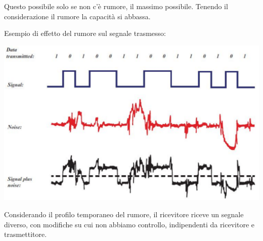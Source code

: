 Questo possibile solo se non c'è rumore, il massimo possibile. Tenendo il considerazione il rumore la capacità si abbassa.

Esempio di effetto del rumore sul segnale trasmesso: 
\begin{center}
	\includegraphics[width=\linewidth]{img/PTT/errors1}
\end{center}
Considerando il profilo temporaneo del rumore, il ricevitore riceve un segnale diverso, con modifiche su cui non abbiamo controllo, indipendenti da ricevitore e trasmettitore.\\

